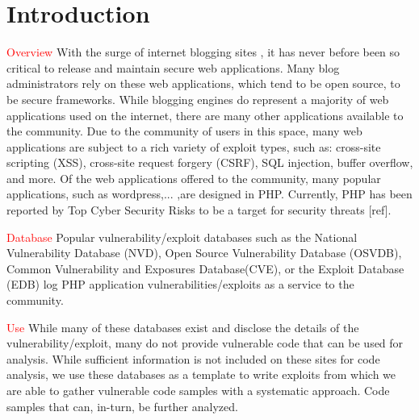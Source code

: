 \documentclass[letterpaper,twocolumn,10pt]{article}
\begin{document}
\section{Introduction}

\textcolor{red}{Overview}
With the surge of internet blogging sites , it has never before been so critical to release and maintain secure web applications.   Many blog administrators rely on these web applications, which tend to be open source, to be secure frameworks.  While blogging engines do represent a majority of web applications used on the internet, there are many other applications available to the community.  Due to the community of users in this space, many web applications are subject to a rich variety of exploit types, such as: cross-site scripting (XSS), cross-site request forgery (CSRF), SQL injection, buffer overflow, and more.  Of the web applications offered to the community, many popular applications, such as wordpress,... ,are designed in PHP.  Currently, PHP has been reported by Top Cyber Security Risks to be a target for security threats [ref].\par

\textcolor{red}{Database}
Popular vulnerability/exploit databases such as the National Vulnerability Database (NVD), Open Source Vulnerability Database (OSVDB), Common Vulnerability and Exposures Database(CVE), or the Exploit Database (EDB) log PHP application vulnerabilities/exploits as a service to the community.   \par

\textcolor{red}{Use}
While many of these databases exist and disclose the details of the vulnerability/exploit, many do not provide vulnerable code that can be used for analysis.  While sufficient information is not included on these sites for code analysis, we use these databases as a template to write exploits from which we are able to gather vulnerable code samples with a systematic approach.  Code samples that can, in-turn, be further analyzed.
\par
\end{document}
